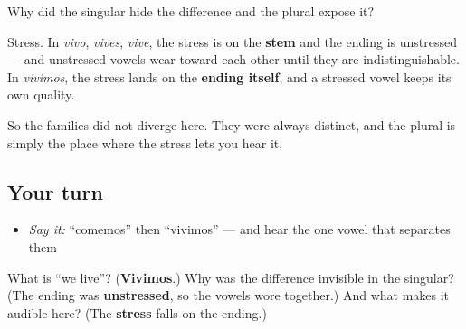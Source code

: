 \begin{cousinweb}
Why did the singular hide the difference and the plural expose it?

Stress. In \emph{vivo}, \emph{vives}, \emph{vive}, the stress is on the \textbf{stem} and the ending is unstressed — and unstressed vowels wear toward each other until they are indistinguishable. In \emph{vivimos}, the stress lands on the \textbf{ending itself}, and a stressed vowel keeps its own quality.

So the families did not diverge here. They were always distinct, and the plural is simply the place where the stress lets you hear it.
\end{cousinweb}

\subsection*{Your turn}
\begin{itemize}
\raggedright
  \item \emph{Say it:} \textquotedblleft{}comemos\textquotedblright{} then \textquotedblleft{}vivimos\textquotedblright{} — and hear the one vowel that separates them
\end{itemize}

\begin{tcolorbox}[breakable,colback=teal!4,colframe=teal!35!black,title={Before you move on}]
What is \textquotedblleft{}we live\textquotedblright{}? (\textbf{Vivimos}.) Why was the difference invisible in the singular? (The ending was \textbf{unstressed}, so the vowels wore together.) And what makes it audible here? (The \textbf{stress} falls on the ending.)
\end{tcolorbox}
